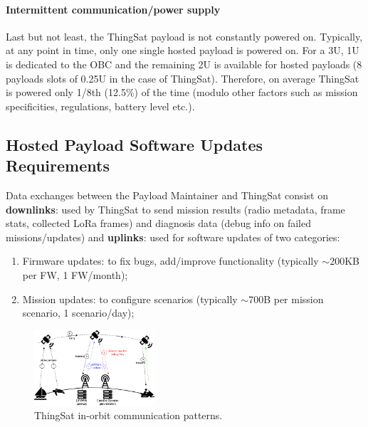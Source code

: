 \paragraph*{Intermittent communication/power supply}
Last but not least, the ThingSat payload is not constantly powered on. Typically, at any point in time,
only one single hosted payload is powered on. For a 3U, 1U is dedicated to the OBC
and the remaining 2U is available for hosted payloads (8 payloads slots of 0.25U
in the case of ThingSat). Therefore, on average ThingSat is powered only 1/8th (12.5\%) of the time
(modulo other factors such as mission specificities, regulations, battery level etc.).

\subsection{Hosted Payload Software Updates Requirements}
\label{sec:thingsat-update-req}
Data exchanges between the Payload Maintainer and ThingSat consist on
\textbf{downlinks}: used by ThingSat to send mission results (radio metadata, frame stats, collected LoRa frames)
and diagnosis data (debug info on failed missions/updates) and \textbf{uplinks}: used for software updates of two categories:
\begin{enumerate}
    \item Firmware updates: to fix bugs, add/improve functionality (typically $\sim$200KB per FW, 1 FW/month);
    \item Mission updates: to configure scenarios (typically $\sim$700B per mission scenario, 1 scenario/day);
\end{enumerate}

\begin{figure}[t]
    \centering
    \includegraphics[width=0.4\textwidth]{Figures/thingsat-dtn.png}
    \caption{ThingSat in-orbit communication patterns.}
    \label{fig:thingsat-comm}
\end{figure}
